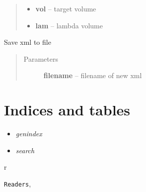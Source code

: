 \documentclass[letterpaper,10pt,english]{sphinxmanual}
\begin{document}
\begin{fulllineitems}
\begin{fulllineitems}
\begin{quote}
\begin{description}
\begin{itemize}
\item {} 
\textbf{vol} -- target volume

\item {} 
\textbf{lam} -- lambda volume

\end{itemize}

\end{description}\end{quote}

\end{fulllineitems}


\begin{fulllineitems}
\label{Experiment:Experiment.Experiment.write}
Save xml to file
\begin{quote}\begin{description}
\item[{Parameters}] \leavevmode
\textbf{filename} -- filename of new xml

\end{description}\end{quote}

\end{fulllineitems}


\end{fulllineitems}



\chapter{Indices and tables}
\label{CC3DSimUtils:indices-and-tables}\begin{itemize}
\item {} 
\emph{genindex}

\item {} 
\emph{search}

\end{itemize}


\renewcommand{\indexname}{Python Module Index}
\begin{theindex}
\def\bigletter#1{{\Large\sffamily#1}\nopagebreak\vspace{1mm}}
\bigletter{r}
\item {\texttt{Readers}}, \pageref{Readers:module-Readers}
\end{theindex}

\renewcommand{\indexname}{Index}
\printindex
\end{document}
